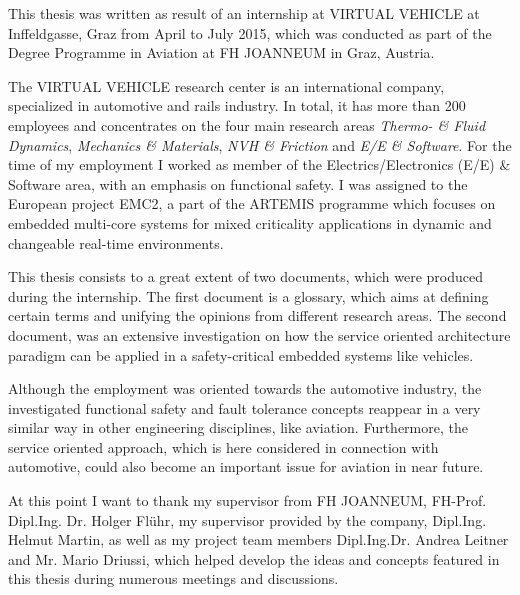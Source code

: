 This thesis was written as result of an internship at VIRTUAL VEHICLE at Inffeldgasse, Graz from April to July 2015, which was conducted as part of the Degree Programme in Aviation at FH JOANNEUM in Graz, Austria.

The VIRTUAL VEHICLE research center is an international company, specialized in automotive and rails industry. In total, it has more than 200 employees and concentrates on the four main research areas \emph{Thermo- \& Fluid Dynamics}, \emph{Mechanics \& Materials}, \emph{NVH \& Friction} and \emph{E/E \& Software}. For the time of my employment I worked as member of the Electrics/Electronics (E/E) \& Software area, with an emphasis on functional safety. I was assigned to the European project EMC2, a part of the ARTEMIS programme which focuses on embedded multi-core systems for mixed criticality applications in dynamic and changeable real-time environments. 

This thesis consists to a great extent of two documents, which were produced during the internship. The first document is a glossary, which aims at defining certain terms and unifying the opinions from different research areas. The second document, was an extensive investigation on how the service oriented architecture paradigm can be applied in a safety-critical embedded systems like vehicles.

Although the employment was oriented towards the automotive industry, the investigated functional safety and fault tolerance concepts reappear in a very similar way in other engineering disciplines, like aviation. Furthermore, the service oriented approach, which is here considered in connection with automotive, could also become an important issue for aviation in near future.

At this point I want to thank my supervisor from FH JOANNEUM, FH-Prof. Dipl.Ing. Dr. Holger Flühr, my supervisor provided by the company, Dipl.Ing. Helmut Martin, as well as my project team members Dipl.Ing.Dr. Andrea Leitner and Mr. Mario Driussi, which helped develop the ideas and concepts featured in this thesis during numerous meetings and discussions.